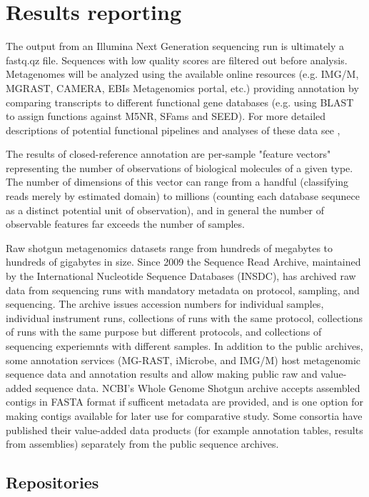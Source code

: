 \documentclass[graybox]{svmult}
\begin{document}
\section{Results reporting }
\label{sec:5}

The output from an Illumina Next Generation sequencing run is ultimately a fastq.qz file. Sequences with low quality scores are filtered out before analysis. Metagenomes will be analyzed using the available online resources (e.g. IMG/M, MGRAST, CAMERA, EBIs Metagenomics portal, etc.) providing annotation by comparing transcripts to different functional gene databases (e.g. using BLAST to assign functions against M5NR, SFams and SEED). For more detailed descriptions of potential functional pipelines and analyses of these data see \cite{Thomas2012}, \cite{MG-RAST} \cite{API}

        The results of closed-reference annotation are per-sample "feature vectors" representing the number of observations of biological molecules of a given type.  The number of dimensions of this vector can range from a handful (classifying reads merely by estimated domain) to millions (counting each database sequnece as a distinct potential unit of observation), and in general the number of observable features far exceeds the number of samples.

        Raw shotgun metagenomics datasets range from hundreds of megabytes to hundreds of gigabytes in size.  Since 2009 the Sequence Read Archive, maintained by the International Nucleotide Sequence Databases (INSDC), has archived raw data from sequencing runs with mandatory metadata on protocol, sampling, and sequencing.  The archive issues accession numbers for individual samples, individual instrument runs, collections of runs with the same protocol, collections of runs with the same purpose but different protocols, and collections of sequencing experiemnts with different samples.  
In addition to the public archives, some annotation services (MG-RAST, iMicrobe, and IMG/M) host metagenomic sequence data and annotation results and allow making public raw and value-added sequence data.    NCBI's Whole Genome Shotgun archive accepts assembled contigs in FASTA format if sufficent metadata are provided, and is one option for making contigs available for later use for comparative study.
Some consortia have published their value-added data products (for example annotation tables, results from assemblies) separately from the public sequence archives.

\subsection{Repositories}
\label{sec:5repos}
\end{document}
